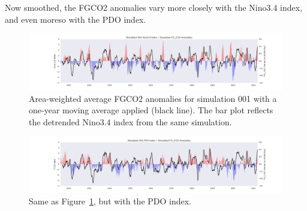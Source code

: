 \documentclass[12pt]{article}
\begin{document}
Now smoothed, the FGCO2 anomalies vary more closely with the Nino3.4 index, and even moreso with the PDO index.
\begin{figure}[!h]
	\centering
	\includegraphics[width=\linewidth]{../../figs/CCS/timeseries/ccs-smoothed-fgco2-and-nino34-plot.png}
	\caption{Area-weighted average FGCO2 anomalies for simulation 001 with a one-year moving average applied (black line). The bar plot reflects the detrended Nino3.4 index from the same simulation.}
	\label{fig:5}
\end{figure}
\begin{figure}[!h]
	\centering
	\includegraphics[width=\linewidth]{../../figs/CCS/timeseries/ccs-smoothed-fgco2-and-pdo-plot.png}
	\caption{Same as Figure~\ref{fig:5}, but with the PDO index.}
	\label{fig:6}
\end{figure}
\end{document}
